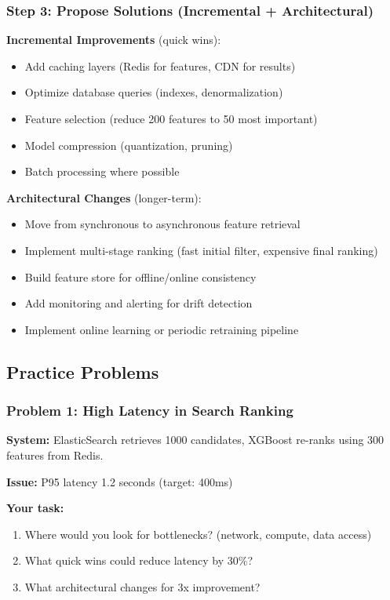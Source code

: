 \documentclass[11pt,letterpaper]{article}
\begin{document}
\subsubsection{Step 3: Propose Solutions (Incremental + Architectural)}

\textbf{Incremental Improvements} (quick wins):
\begin{itemize}
    \item Add caching layers (Redis for features, CDN for results)
    \item Optimize database queries (indexes, denormalization)
    \item Feature selection (reduce 200 features to 50 most important)
    \item Model compression (quantization, pruning)
    \item Batch processing where possible
\end{itemize}

\textbf{Architectural Changes} (longer-term):
\begin{itemize}
    \item Move from synchronous to asynchronous feature retrieval
    \item Implement multi-stage ranking (fast initial filter, expensive final ranking)
    \item Build feature store for offline/online consistency
    \item Add monitoring and alerting for drift detection
    \item Implement online learning or periodic retraining pipeline
\end{itemize}

\subsection{Practice Problems}

\subsubsection{Problem 1: High Latency in Search Ranking}

\textbf{System:} ElasticSearch retrieves 1000 candidates, XGBoost re-ranks using 300 features from Redis.

\textbf{Issue:} P95 latency 1.2 seconds (target: 400ms)

\textbf{Your task:}
\begin{enumerate}
    \item Where would you look for bottlenecks? (network, compute, data access)
    \item What quick wins could reduce latency by 30\%?
    \item What architectural changes for 3x improvement?
\end{enumerate}
\end{document}
